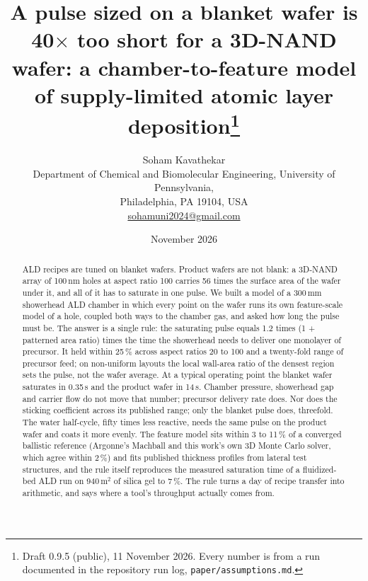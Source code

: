 \documentclass[11pt,letterpaper]{article}
\title{A pulse sized on a blanket wafer is 40$\times$ too short for a 3D-NAND wafer: a chamber-to-feature model of supply-limited atomic layer deposition\thanks{Draft 0.9.5 (public), 11 November 2026. Every number is from a run documented in the repository run log, \texttt{paper/assumptions.md}.}}
\author{Soham Kavathekar\\[2pt]
\small Department of Chemical and Biomolecular Engineering, University of Pennsylvania,\\
\small Philadelphia, PA 19104, USA\\
\small \href{mailto:sohamuni2024@gmail.com}{sohamuni2024@gmail.com}}
\date{November 2026}
\begin{document}
\maketitle

\begin{abstract}
ALD recipes are tuned on blanket wafers. Product wafers are not blank: a 3D-NAND array of 100\,nm holes at aspect ratio 100 carries 56 times the surface area of the wafer under it, and all of it has to saturate in one pulse. We built a model of a 300\,mm showerhead ALD chamber in which every point on the wafer runs its own feature-scale model of a hole, coupled both ways to the chamber gas, and asked how long the pulse must be. The answer is a single rule: the saturating pulse equals 1.2 times (1 + patterned area ratio) times the time the showerhead needs to deliver one monolayer of precursor. It held within 25\,\% across aspect ratios 20 to 100 and a twenty-fold range of precursor feed; on non-uniform layouts the local wall-area ratio of the densest region sets the pulse, not the wafer average. At a typical operating point the blanket wafer saturates in 0.35\,s and the product wafer in 14\,s. Chamber pressure, showerhead gap and carrier flow do not move that number; precursor delivery rate does. Nor does the sticking coefficient across its published range; only the blanket pulse does, threefold. The water half-cycle, fifty times less reactive, needs the same pulse on the product wafer and coats it more evenly. The feature model sits within 3 to 11\,\% of a converged ballistic reference (Argonne's Machball and this work's own 3D Monte Carlo solver, which agree within 2\,\%) and fits published thickness profiles from lateral test structures, and the rule itself reproduces the measured saturation time of a fluidized-bed ALD run on 940\,m$^2$ of silica gel to 7\,\%. The rule turns a day of recipe transfer into arithmetic, and says where a tool's throughput actually comes from.
\end{abstract}
\end{document}
